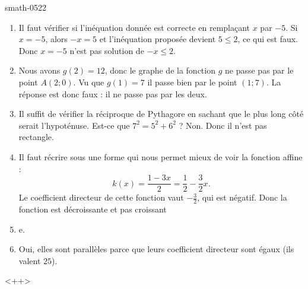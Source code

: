
\begin{corrige}{smath-0522}

    \begin{enumerate}
        \item
            Il faut vérifier si l'inéquation donnée est correcte en remplaçant \( x\) par \( -5\). Si \( x=-5\), alors \( -x=5\) et l'inéquation proposée devient \( 5\leq 2\), ce qui est faux. Donc \( x=-5\) n'est pas solution de \( -x\leq 2\).

        \item
            Nous avons \( g(2)=12\), donc le graphe de la fonction \( g\) ne passe pas par le point \( A(2;0)\). Vu que \( g(1)=7\) il passe bien par le point \( (1;7)\). La réponse est donc faux : il ne passe pas par les deux.
        \item
            Il suffit de vérifier la réciproque de Pythagore en sachant que le plus long côté serait l'hypoténuse. Est-ce que \( 7^2=5^2+6^2\) ? Non. Donc il n'est pas rectangle.
        \item
            Il faut récrire sous une forme qui nous permet mieux de voir la fonction affine :
            \begin{equation}
                k(x)=\frac{ 1-3x }{ 2 }=\frac{ 1 }{2}-\frac{ 3 }{2}x.
            \end{equation}
            Le coefficient directeur de cette fonction vaut \( -\frac{ 3 }{2}\), qui est négatif. Donc la fonction est décroissante et pas croissant\item e. 
            \item
                Oui, elles sont parallèles parce que leurs coefficient directeur sont égaux (ils valent \( 25\)).
    \end{enumerate}
    <++>

\end{corrige}
